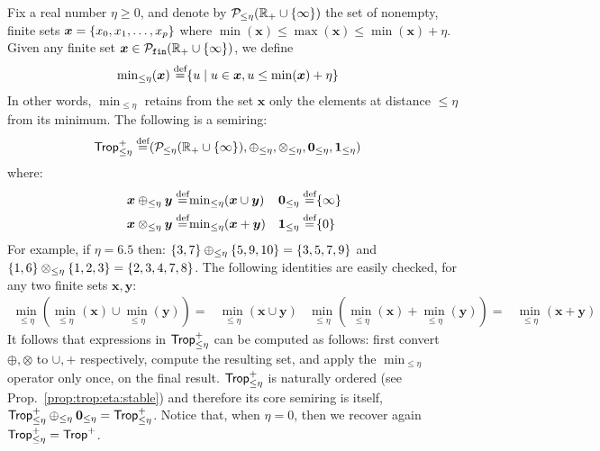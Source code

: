 \begin{ex} \label{ex:trop:eta} Fix a real number $\eta \geq 0$, and
  denote by $\mathcal P_{\leq \eta}(\mathbb R_+\cup\{\infty\})$ the set of
  nonempty, finite sets $\bm x = \{x_0, x_1, \ldots, x_p\}$ where
  $\min(\bm x) \leq \max(\bm x)\leq \min(\bm x) + \eta$.  Given any
  finite set $\bm x \in \mathcal P_{\texttt{fin}}(\mathbb R_+\cup\{\infty\})$,
  we define
  \begin{align*}
    {\min}_{\leq \eta}(\bm x) \stackrel{\text{def}}{=} & \{{u}\mid{u \in \bm x, u \leq \min(\bm x) + \eta}\}
  \end{align*}
  In other words, $\min_{\leq \eta}$ retains from the set $\bm x$ only
  the elements at distance $\leq \eta$ from its minimum.  The
  following is a semiring:
  \begin{align*}
    \text{\sf Trop}^+_{\leq\eta} \stackrel{\text{def}}{=} & (\mathcal P_{\leq \eta}(\mathbb R_+\cup\{\infty\}),\oplus_{\leq\eta},\otimes_{\leq\eta},\bm 0_{\leq\eta},\bm 1_{\leq\eta})
  \end{align*}
  where:
  \begin{align*}
    \bm x \oplus_{\leq\eta} \bm y \stackrel{\text{def}}{=} & {\min}_{\leq\eta}(\bm x \cup \bm y) &
    \bm 0_{\leq\eta} \stackrel{\text{def}}{=} & \{\infty\} \\
    \bm x \otimes_{\leq\eta} \bm y \stackrel{\text{def}}{=} & {\min}_{\leq\eta}(\bm x + \bm y)&
    \bm 1_{\leq\eta} \stackrel{\text{def}}{=} & \{0\}
   \end{align*}
   For example, if $\eta = 6.5$ then:
   $\{3,7\} \oplus_{\leq \eta} \{5,9,10\} = \{3,5,7,9\}$ and
   $\{1,6\} \otimes_{\leq \eta} \{1,2,3\} = \{2,3,4,7,8\}$.
   The following identities are easily checked, for any two finite
   sets $\bm x, \bm y$:
  \begin{align}
    {\min}_{\leq \eta}({\min}_{\leq \eta}(\bm x) \cup {\min}_{\leq \eta}(\bm y))= & {\min}_{\leq \eta}(\bm x \cup \bm y)&
    {\min}_{\leq \eta}({\min}_{\leq \eta}(\bm x) + {\min}_{\leq \eta}(\bm y))= & {\min}_{\leq \eta}(\bm x + \bm y) \label{eq:mineta:identity}
  \end{align}
  It follows that expressions in $\text{\sf Trop}^+_{\leq\eta}$ can be computed
  as follows: first convert $\oplus, \otimes$ to $\cup, +$
  respectively, compute the resulting set, and apply the
  $\min_{\leq\eta}$ operator only once, on the final result.
  $\text{\sf Trop}^+_{\leq \eta}$ is naturally ordered (see
  Prop.~\ref{prop:trop:eta:stable}) and therefore its core semiring is
  itself,
  $\text{\sf Trop}^+_{\leq \eta}\oplus_{\leq \eta} \bm 0_{\leq \eta} =
  \text{\sf Trop}^+_{\leq\eta}$.
%
%
  Notice that, when $\eta=0$, then we recover again
  $\text{\sf Trop}^+_{\leq \eta} = \text{\sf Trop}^+$.
\end{ex}

